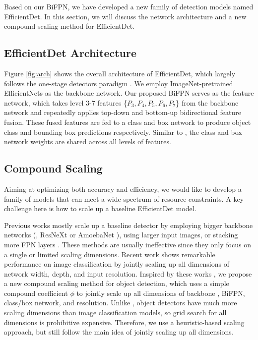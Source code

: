 \documentclass[10pt,twocolumn,letterpaper]{article}
\begin{document}
Based on our BiFPN, we have developed a new family of detection models named EfficientDet. In this section, we will discuss the network architecture and a new compound scaling method for EfficientDet.

\subsection{EfficientDet Architecture}
\label{subsec:overview}

Figure \ref{fig:arch} shows the overall architecture of EfficientDet, which largely follows the one-stage detectors paradigm \cite{ssd16,yolo17,fpn17,retinanet17}. We employ ImageNet-pretrained EfficientNets as the backbone network. Our proposed BiFPN serves as the feature network, which takes level 3-7 features \{$P_3, P_4, P_5, P_6, P_7$\} from the backbone network and repeatedly applies top-down and bottom-up bidirectional feature fusion. These fused features are fed to a class and box  network to produce object class  and bounding box predictions respectively. Similar to \cite{retinanet17}, the class and box network weights are shared across all levels of features.


\subsection{Compound Scaling}
\label{subsec:scaling}


Aiming at optimizing both accuracy and efficiency, we would like to develop a family of models  that can meet a wide spectrum of resource constraints. A key challenge here is how to scale up a baseline EfficientDet model.

Previous works mostly scale up a baseline detector by employing bigger backbone networks (\eg, ResNeXt \cite{resnext17} or AmoebaNet \cite{amoebanets18}), using larger input images, or stacking more FPN layers \cite{nasfpn19}. These methods are usually ineffective since they only focus on a single or  limited scaling dimensions.
Recent work \cite{efficientnet19} shows remarkable performance on image classification by jointly scaling up all dimensions of network width, depth, and input resolution. Inspired by these works \cite{nasfpn19,efficientnet19}, we propose a new compound scaling method for object detection, which uses a simple compound coefficient $\phi$ to jointly scale up all dimensions of backbone , BiFPN, class/box network, and resolution. Unlike \cite{efficientnet19}, object detectors have much more scaling dimensions than image classification models, so grid search for all dimensions is prohibitive expensive. Therefore, we use a heuristic-based scaling approach, but still follow the main idea of jointly scaling up all dimensions.
\end{document}
